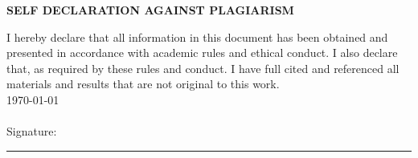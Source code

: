     \begin{center}
	\textbf{\large{SELF DECLARATION AGAINST PLAGIARISM}}
	\vspace*{1 cm}
\end{center}
	I hereby declare that all information in this document has been obtained and presented in accordance with academic rules and ethical conduct. I also declare that, as required by these rules and conduct. I have full cited and referenced all materials and results that are not original to this work.\\
	
	\noindent\today\\
	\Penulis\\
	
	\noindent Signature:\rule{4cm}{0.4pt}
